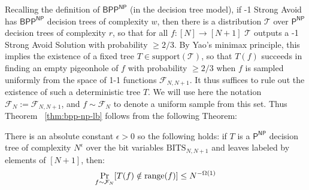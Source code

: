 \medskip
Recalling the definition of $\mathsf{BPP^{NP}}$ (in the decision tree model), if {-1 Strong Avoid} has $\mathsf{BPP^{NP}}$ decision trees of complexity $w$, then there is a distribution $\mathcal{T}$ over $\mathsf{P^{NP}}$ decision trees of complexity $r$, so that for all $f: [N] \to [N+1]$ $\mathcal{T}$ outputs a {-1 Strong Avoid} Solution with probability $\geq 2/3$. By Yao's minimax principle, this implies the existence of a fixed tree $T \in \mathrm{support}(\mathcal{T})$, so that $T(f)$ succeeds in finding an empty pigeonhole of $f$ with probability $\geq 2/3$ when $f$ is sampled uniformly from the space of 1-1 functions $\mathcal{F}_{N,N+1}$. It thus suffices to rule out the existence of such a deterministic tree $T$. We will use here the notation $\mathcal{F}_N := \mathcal{F}_{N,N+1}$, and $f \sim \mathcal{F}_N$ to denote a uniform sample from this set. Thus Theorem ~\ref{thm:bpp-np-lb} follows from the following Theorem:

\begin{theorem}\label{thm:bpp-np-lb-dt}
There is an absolute constant $\epsilon > 0$ so the following holds: if $T$ is a $\mathsf{P^{NP}}$ decision tree of complexity $N^{\epsilon}$ over the bit variables $\mathrm{BITS}_{N,N+1}$ and leaves labeled by elements of $[N+1]$, then:
\[
\Pr_{f \sim \mathcal{F}_N} [T(f) \notin \mathrm{range}(f)] \leq N^{-\Omega(1)}
\]

\end{theorem}


